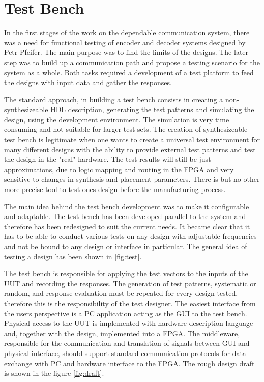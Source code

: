 \chapter{Test Bench}\label{ch:test_bench}
In the first stages of the work on the dependable communication system, there was a need for functional testing of encoder and decoder systems designed by Petr Pfeifer. The main purpose was to find the limits of the designs. The later step was to build up a communication path and propose a testing scenario for the system as a whole. Both tasks required a development of a test platform to feed the designs with input data and gather the responses.

The standard approach, in building a test bench consists in creating a non-synthesizeable HDL description, generating the test patterns and simulating the design, using the development environment. The simulation is very time consuming and not suitable for larger test sets. The creation of synthesizeable test bench is legitimate when one wants to create a universal test environment for many different designs with the ability to provide external test patterns and test the design in the "real" hardware. The test results will still be just approximations, due to logic mapping and routing in the FPGA and very sensitive to changes in synthesis and placement parameters. There is but no other more precise tool to test ones design before the manufacturing process.

The main idea behind the test bench development was to make it configurable and adaptable. The test bench has been developed parallel to the system and therefore has been redesigned to suit the current needs. It became clear that it has to be able to conduct various tests on any design with adjustable frequencies and not be bound to any design or interface in particular. The general idea of testing a design has been shown in \autoref{fig:test}.

The test bench is responsible for applying the test vectors to the inputs of the UUT and recording the responses. The generation of test patterns, systematic or random, and response evaluation must be repeated for every design tested, therefore this is the responsibility of the test designer. The easiest interface from the users perspective is a PC application acting as the GUI to the test bench. Physical access to the UUT is implemented with hardware description language and, together with the design, implemented into a FPGA. The middleware, responsible for the communication and translation of signals between GUI and physical interface, should support standard communication protocols for data exchange with PC and hardware interface to the FPGA. The rough design draft is shown in the figure \autoref{fig:draft}.\\
 

